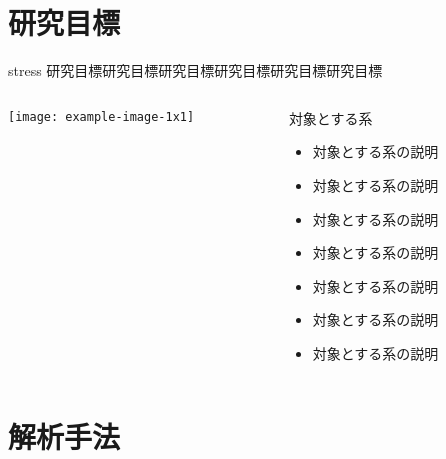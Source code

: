 \documentclass[12pt,dvipdfmx,svgnames,uplatex,aspectratio=169]{beamer}
\begin{document}
\section{研究目標}
\begin{frame}{\insertsection}
  \hfill
  \begin{beamercolorbox}[rounded=true, wd=0.8\textwidth]{stress}
    \centering
    研究目標研究目標研究目標研究目標研究目標研究目標
  \end{beamercolorbox}
  \hfill\hfill
  \pause
  \begin{columns}[T]
    \begin{column}{0.4\textwidth}
      \vspace{\baselineskip}
      \centering
      \texttt{[image: example-image-1x1]}
    \end{column}
    \begin{column}{0.6\textwidth}
      \begin{block}{対象とする系}
        \begin{itemize}
          \item 対象とする系の説明
          \item 対象とする系の説明
          \item 対象とする系の説明
          \item 対象とする系の説明
          \item 対象とする系の説明
          \item 対象とする系の説明
          \item 対象とする系の説明
        \end{itemize}
      \end{block}
    \end{column}
  \end{columns}
\end{frame}


\section{解析手法}
\end{document}
